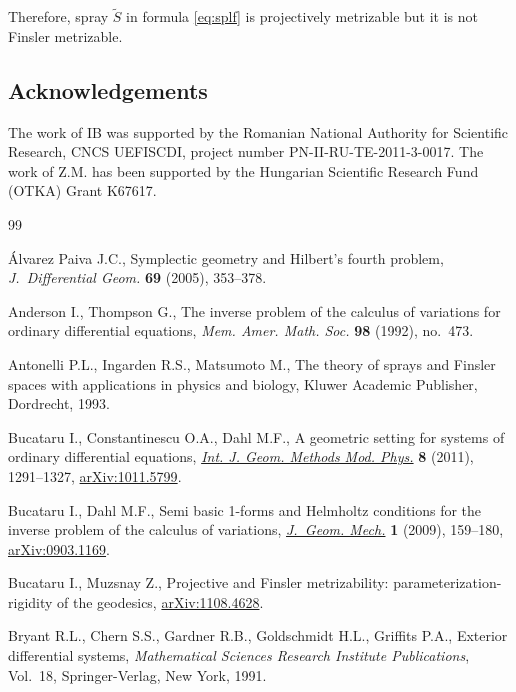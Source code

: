 \documentclass[pdftex]{sigma}
\numberwithin{equation}{section}
\begin{document}
Therefore, spray $\widetilde{S}$ in formula \eqref{eq:splf}  is
projectively metrizable but it is not Finsler metrizable.

\subsection*{Acknowledgements}
The work of IB was supported by the Romanian National
Authority for Scientif\/ic Research, CNCS UEFISCDI, project number
PN-II-RU-TE-2011-3-0017. The work of Z.M. has been
supported by the Hungarian Scientif\/ic Research Fund (OTKA) Grant K67617.


\begin{thebibliography}{99}

\footnotesize\itemsep=0pt

\'Alvarez Paiva J.C.,
Symplectic geometry and Hilbert's fourth problem,
{\it J.~Differential Geom.} {\bf 69} (2005), 353--378.

Anderson I., Thompson G.,
The inverse problem of the calculus of variations for ordinary dif\/ferential equations,
{\it Mem. Amer. Math. Soc.} {\bf 98} (1992),  no.~473.

Antonelli P.L., Ingarden  R.S., Matsumoto M.,
The theory of sprays and Finsler spaces with applications in physics and biology,
Kluwer Academic Publisher, Dordrecht, 1993.

Bucataru I., Constantinescu O.A., Dahl M.F.,
A geometric setting for systems of ordinary dif\/ferential equations,
\href{http://dx.doi.org/10.1142/S0219887811005701}{{\it Int. J. Geom. Methods Mod. Phys.}} {\bf 8} (2011), 1291--1327,
\href{http://arxiv.org/abs/1011.5799}{arXiv:1011.5799}.

Bucataru I., Dahl M.F.,
Semi basic 1-forms and Helmholtz conditions for the inverse problem of the calculus of variations,
\href{http://dx.doi.org/10.3934/jgm.2009.1.159}{{\it J.~Geom. Mech.}}  {\bf 1} (2009), 159--180,
\href{http://arxiv.org/abs/0903.1169}{arXiv:0903.1169}.

Bucataru I., Muzsnay Z.,
Projective and Finsler metrizability: parameterization-rigidity of the geodesics,
\href{http://arxiv.org/abs/1108.4628}{arXiv:1108.4628}.

Bryant R.L., Chern S.S.,  Gardner R.B., Goldschmidt H.L., Grif\/f\/its P.A.,
Exterior dif\/ferential systems, {\it Mathematical Sciences Research Institute Publications}, Vol.~18, Springer-Verlag, New York, 1991.


\end{thebibliography}
\end{document}
